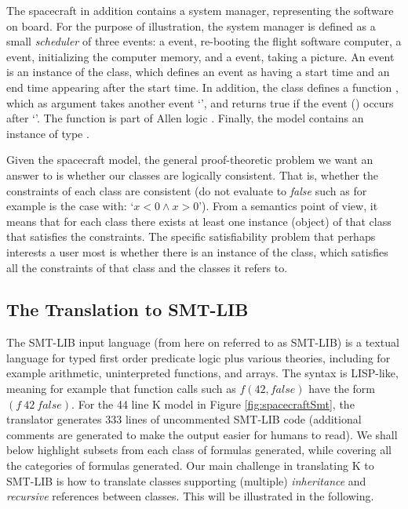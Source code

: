 The spacecraft in addition contains a system manager, representing the
software on board. For the purpose of illustration, the system manager
is defined as a small {\em scheduler} of three events: a 
event, re-booting the flight software computer, a 
event, initializing the computer memory, and a 
event, taking a picture. An event is an instance of the 
class, which defines an event as having a start time and an end time
appearing after the start time. In addition, the  class
defines a function , which as argument takes another event
`', and returns true if the event () occurs after
`'.  The  function is part of Allen logic
\cite{allen-logic-84}.
%
Finally, the model contains an instance  of type
.

Given the spacecraft model, the general proof-theoretic problem we
want an answer to is whether our classes are logically
consistent. That is, whether the constraints of each class are
consistent (do not evaluate to {\em false} such as for example is the
case with: `$x < 0 \wedge x > 0$'). From a semantics point of view, it
means that for each class there exists at least one instance (object)
of that class that satisfies the constraints.  The specific
satisfiability problem that perhaps interests a user most is whether
there is an instance  of the  class,
which satisfies all the constraints of that class and the classes it
refers to.

\subsection{The Translation to SMT-LIB}

The SMT-LIB input language (from here on referred to as SMT-LIB) is a
textual language for typed first order predicate logic plus various
theories, including for example arithmetic, uninterpreted functions,
and arrays. The syntax is LISP-like, meaning for example that function
calls such as $f(42,false)$ have the form $(f\ 42\ false)$. For the 44
line K model in Figure \ref{fig:spacecraftSmt}, the translator
generates 333 lines of uncommented SMT-LIB code (additional comments
are generated to make the output easier for humans to read). We shall
below highlight subsets from each class of formulas generated, while
covering all the categories of formulas generated. Our main challenge
in translating K to SMT-LIB is how to translate classes 
supporting (multiple) {\em inheritance} and {\em recursive} references
between classes. This will be illustrated in the following.

